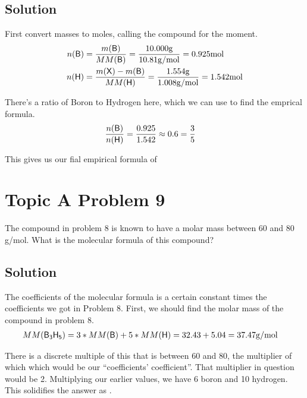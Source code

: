 \documentclass[10pt]{article}
\begin{document}
        \subsection{Solution}
            First convert masses to moles, calling the compound  for the moment.
            \begin{align}
                n(\ce{B})   &=  \frac{m(\ce{B})}{MM(\ce{B})}
                    =   \frac{10.000 \unit{\gram}}{10.81 \unit{\gram/\mole}}
                    =   0.925 \unit{\mole}\\
                n(\ce{H})   &=  \frac{m(\ce{X}) - m(\ce{B})}{MM(\ce{H})}
                    =   \frac{1.554 \unit{\gram}}{1.008 \unit{\gram/\mole}}
                    =   1.542 \unit{\mole}
            \end{align}

            There's a ratio of Boron to Hydrogen here, which we can use to find the emprical formula.
            \begin{align}
                \frac{n(\ce{B})}{n(\ce{H})} &=  \frac{0.925}{1.542} \approx 0.6 = \frac{3}{5}
            \end{align}

            This gives us our fial empirical formula of 

    \pagebreak
    \section{Topic A Problem 9}
        The compound in problem 8 is known to have a molar mass between 60 and 80 g/mol. 
        What is the molecular formula of this compound?
            
        \subsection{Solution}
            The coefficients of the molecular formula is a certain constant times the coefficients we got in Problem 8.
            First, we should find the molar mass of the compound in problem 8.
            \begin{align}
                MM(\ce{B3H5})   &=  3 * MM(\ce{B}) + 5 * MM(\ce{H})
                    =   32.43 + 5.04
                    =   37.47 \unit{\gram/\mole}
            \end{align}

            There is a discrete multiple of this that is between 60 and 80, the multiplier of which which would be our ``coefficients' coefficient''.
            That multiplier in question would be 2.
            Multiplying our earlier values, we have 6 boron and 10 hydrogen.
            This solidifies the answer as .
\end{document}
